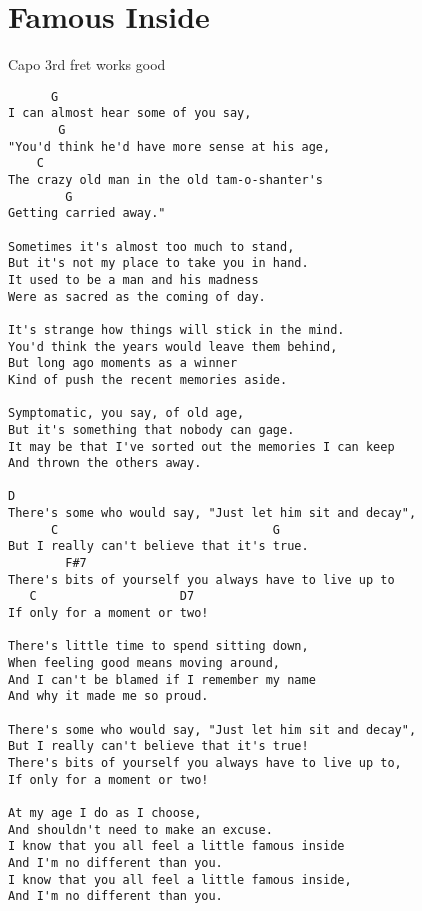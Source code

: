 \documentclass[leqno]{memoir}
\begin{document}
\chapter{Famous Inside}
Capo 3rd fret works good
\begin{verbatim}
      G
I can almost hear some of you say,
       G
"You'd think he'd have more sense at his age,
    C
The crazy old man in the old tam-o-shanter's
        G
Getting carried away."

Sometimes it's almost too much to stand,
But it's not my place to take you in hand.
It used to be a man and his madness
Were as sacred as the coming of day.

It's strange how things will stick in the mind.
You'd think the years would leave them behind,
But long ago moments as a winner
Kind of push the recent memories aside.

Symptomatic, you say, of old age,
But it's something that nobody can gage.
It may be that I've sorted out the memories I can keep
And thrown the others away.

D
There's some who would say, "Just let him sit and decay",
      C                              G
But I really can't believe that it's true.
        F#7
There's bits of yourself you always have to live up to
   C                    D7
If only for a moment or two!

There's little time to spend sitting down,
When feeling good means moving around,
And I can't be blamed if I remember my name
And why it made me so proud.

There's some who would say, "Just let him sit and decay",
But I really can't believe that it's true!
There's bits of yourself you always have to live up to,
If only for a moment or two!

At my age I do as I choose,
And shouldn't need to make an excuse.
I know that you all feel a little famous inside
And I'm no different than you.
I know that you all feel a little famous inside,
And I'm no different than you.
\end{verbatim}
\newpage
\end{document}

